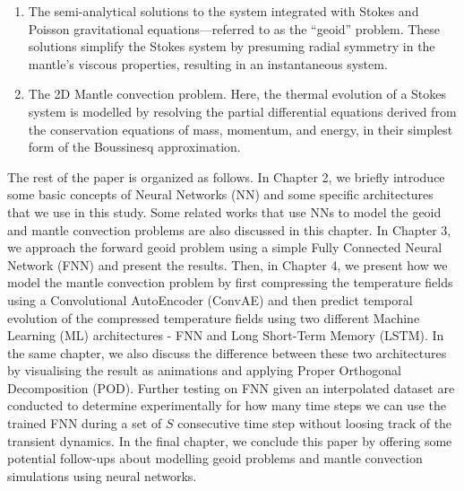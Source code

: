 \begin{enumerate}
    \item The semi-analytical solutions to the system integrated with Stokes and Poisson gravitational equations—referred to as the ``geoid'' problem. These solutions simplify the Stokes system by presuming radial symmetry in the mantle's viscous properties, resulting in an instantaneous system.

    \item The 2D Mantle convection problem. Here, the thermal evolution of a Stokes system is modelled by resolving the partial differential equations derived from the conservation equations of mass, momentum, and energy, in their simplest form of the Boussinesq approximation. 
\end{enumerate}

The rest of the paper is organized as follows. In Chapter 2, we briefly introduce some basic concepts of Neural Networks (NN) and some specific architectures that we use in this study. Some related works that use NNs to model the geoid and mantle convection problems are also discussed in this chapter. In Chapter 3, we approach the forward geoid problem using a simple Fully Connected Neural Network (FNN) and present the results. Then, in Chapter 4, we present how we model the mantle convection problem by first compressing the temperature fields using a Convolutional AutoEncoder (ConvAE) and then predict temporal evolution of the compressed temperature fields using two different Machine Learning (ML) architectures - FNN and Long Short-Term Memory (LSTM). In the same chapter, we also discuss the difference between these two architectures by visualising the result as animations and applying Proper Orthogonal Decomposition (POD). Further testing on FNN given an interpolated dataset are conducted to determine experimentally for how many time steps we can use the trained FNN during
a set of $S$ consecutive time step without loosing track of the transient dynamics. In the final chapter, we conclude this paper by offering some potential follow-ups about modelling geoid problems and mantle convection simulations using neural networks.